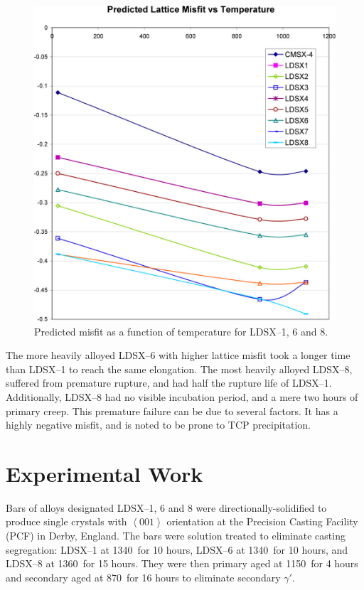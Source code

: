 \begin{figure}[H]
\begin{center}
\includegraphics{MisfitJMatPro}
\caption{Predicted misfit as a function of temperature for LDSX--1, 6 and 8.}
\label{fig:MisfitJMatPro}
\end{center}
\end{figure}
%
The more heavily alloyed LDSX--6 with higher lattice misfit took a longer time than LDSX--1 to reach the same elongation.  The most heavily alloyed LDSX--8, suffered from premature rupture, and had half the rupture life of LDSX--1.  Additionally, LDSX--8 had no visible incubation period, and a mere two hours of primary creep.  This premature failure can be due to several factors.  It has a highly negative misfit, and is noted to be prone to TCP precipitation. 




\section{Experimental Work}

Bars of alloys designated LDSX--1, 6 and 8 were directionally-solidified to produce single crystals with $\left<001\right>$ orientation at the Precision Casting Facility (PCF) in Derby, England.  The bars were solution treated to eliminate casting segregation: LDSX--1 at 1340\celsius\ for 10 hours, LDSX--6 at 1340\celsius\ for 10 hours, and LDSX--8 at 1360\celsius\ for 15 hours.  They were then primary aged at 1150\celsius\ for 4 hours and secondary aged at 870\celsius\ for 16 hours to eliminate secondary $\gamma'$. 

